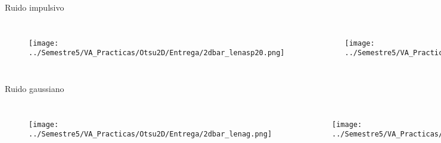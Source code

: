 \documentclass{beamer}
\begin{document}

\begin{frame}
Ruido impulsivo
\begin{columns}[t] %
\begin{figure}
\texttt{[image: ../Semestre5/VA\_Practicas/Otsu2D/Entrega/2dbar\_lenasp20.png]}

\end{figure}

\begin{figure}
\texttt{[image: ../Semestre5/VA\_Practicas/Otsu2D/Entrega/lena512sp20.png]}
\end{figure}

\end{columns}
\end{frame}

\begin{frame}
Ruido gaussiano
\begin{columns}[t] %
\begin{figure}
\texttt{[image: ../Semestre5/VA\_Practicas/Otsu2D/Entrega/2dbar\_lenag.png]}

\end{figure}

\begin{figure}
\texttt{[image: ../Semestre5/VA\_Practicas/Otsu2D/Entrega/lena512g.png]}
\end{figure}

\end{columns}
\end{frame}

\end{document}
